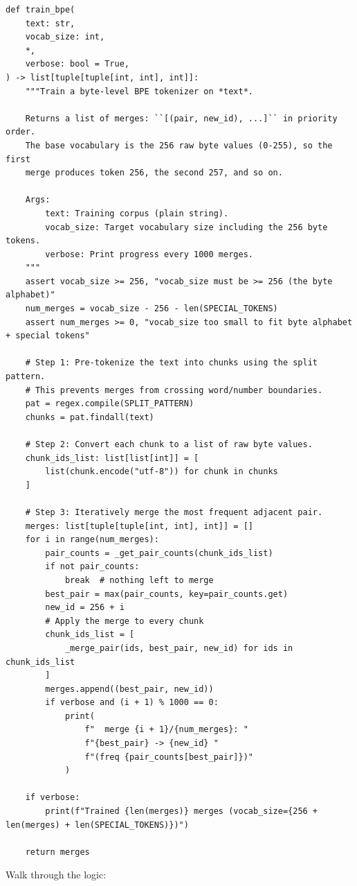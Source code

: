 \begin{lstlisting}
def train_bpe(
    text: str,
    vocab_size: int,
    *,
    verbose: bool = True,
) -> list[tuple[tuple[int, int], int]]:
    """Train a byte-level BPE tokenizer on *text*.

    Returns a list of merges: ``[(pair, new_id), ...]`` in priority order.
    The base vocabulary is the 256 raw byte values (0-255), so the first
    merge produces token 256, the second 257, and so on.

    Args:
        text: Training corpus (plain string).
        vocab_size: Target vocabulary size including the 256 byte tokens.
        verbose: Print progress every 1000 merges.
    """
    assert vocab_size >= 256, "vocab_size must be >= 256 (the byte alphabet)"
    num_merges = vocab_size - 256 - len(SPECIAL_TOKENS)
    assert num_merges >= 0, "vocab_size too small to fit byte alphabet + special tokens"

    # Step 1: Pre-tokenize the text into chunks using the split pattern.
    # This prevents merges from crossing word/number boundaries.
    pat = regex.compile(SPLIT_PATTERN)
    chunks = pat.findall(text)

    # Step 2: Convert each chunk to a list of raw byte values.
    chunk_ids_list: list[list[int]] = [
        list(chunk.encode("utf-8")) for chunk in chunks
    ]

    # Step 3: Iteratively merge the most frequent adjacent pair.
    merges: list[tuple[tuple[int, int], int]] = []
    for i in range(num_merges):
        pair_counts = _get_pair_counts(chunk_ids_list)
        if not pair_counts:
            break  # nothing left to merge
        best_pair = max(pair_counts, key=pair_counts.get)
        new_id = 256 + i
        # Apply the merge to every chunk
        chunk_ids_list = [
            _merge_pair(ids, best_pair, new_id) for ids in chunk_ids_list
        ]
        merges.append((best_pair, new_id))
        if verbose and (i + 1) % 1000 == 0:
            print(
                f"  merge {i + 1}/{num_merges}: "
                f"{best_pair} -> {new_id} "
                f"(freq {pair_counts[best_pair]})"
            )

    if verbose:
        print(f"Trained {len(merges)} merges (vocab_size={256 + len(merges) + len(SPECIAL_TOKENS)})")

    return merges
\end{lstlisting}

Walk through the logic:

